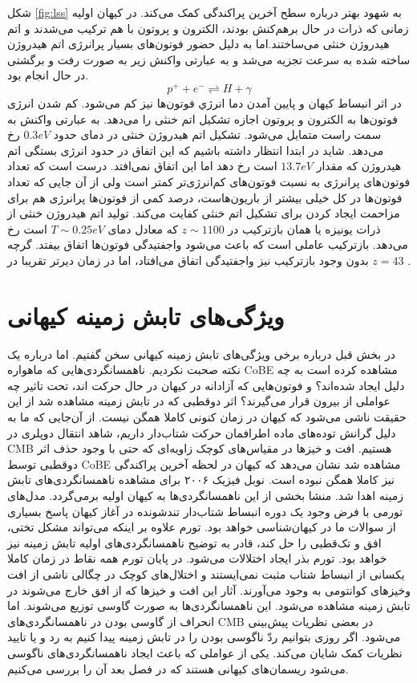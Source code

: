  شکل
\ref{fig:lss}
به شهود بهتر درباره سطح آخرین پراکندگی کمک می‌کند.   
 در کیهان اولیه زمانی که ذرات در حال برهم‌کنش بودند، الکترون و پروتون با هم ترکیب می‌شدند و اتم هیدروژن خنثی می‌ساختند.اما به دلیل حضور فوتون‌های بسیار پرانرژی اتم هیدروژن ساخته شده به سرعت تجزیه می‌شد و به عبارتی واکنش زیر به صورت رفت و برگشتی در حال انجام بود.
\begin{equation}
p^{+} + e^{-} \rightleftharpoons H + \gamma
\end{equation} 
در اثر انبساط کیهان و پایین آمدن دما انرژي فوتون‌ها نیز کم می‌شود. کم شدن انرژی فوتون‌ها به الکترون و پروتون اجازه تشکیل اتم خنثی را می‌دهد. به عبارتی واکنش به سمت راست متمایل می‌شود. تشکیل اتم هیدروژن خنثی در دمای حدود 
$0.3 eV$ 
رخ می‌دهد. شاید در ابتدا انتظار داشته باشیم که این اتفاق در حدود انرژی بستگی اتم هیدروژن که مقدار 
$13.7 eV$
است رخ دهد اما این اتفاق نمی‌افتد. درست است که تعداد فوتون‌های پرانرژی به نسبت فوتون‌های کم‌انرژی‌تر کمتر است ولی از آن جایی که تعداد فوتون‌ها در کل خیلی بیشتر از باریون‌هاست، درصد کمی از فوتون‌ها پرانرژی هم برای مزاحمت ایجاد کردن برای تشکیل اتم خنثی کفایت می‌کند. تولید اتم هیدروژن خنثی از ذرات یونیزه یا همان بازترکیب در 
$ z \sim 1100$ 
که معادل دمای 
$T \sim 0.25 eV$
است رخ می‌دهد.
\cite{dodelson2020modern} 
بازترکیب عاملی است که باعث می‌شود واجفتیدگی فوتون‌ها اتفاق بیفتد. گرچه بدون وجود بازترکیب نیز واجفتیدگی اتفاق می‌افتاد، اما در زمان دیرتر تقریبا در 
$z = 43 $
. 
\cite{dodelson2003modern} 

\section{ ویژگی‌های تابش زمینه کیهانی}
\label{sec:cmb_physics}
در بخش قبل درباره برخی ویژگی‌های تابش زمینه کیهانی سخن گفتیم. اما درباره یک نکته صحبت نکردیم. ناهمسانگردی‌هایی که ماهواره CoBE مشاهده کرده است به چه دلیل ایجاد شده‌اند؟ و فوتون‌هایی که آزادانه در کیهان در حال حرکت اند، تحت تاثیر چه عواملی از بیرون قرار می‌گیرند؟
اثر دوقطبی که در تابش زمینه مشاهده شد از این حقیقت ناشی می‌شود که کیهان در زمان کنونی کاملا همگن نیست. از آن‌جایی که ما به دلیل گرانش توده‌های ماده اطرافمان حرکت شتاب‌دار داریم، شاهد انتقال دوپلری در CMB هستیم. افت و خیزها در مقیاس‌های کوچک زاویه‌ای که حتی با وجود حذف اثر دوقطبی توسط CoBE مشاهده شد نشان می‌دهد که کیهان در لحظه آخرین پراکندگی نیز کاملا همگن نبوده است. نوبل فیزیک ۲۰۰۶ برای مشاهده ناهمسانگردی‌های تابش زمینه اهدا شد. منشا بخشی از این ناهمسانگردی‌ها به کیهان اولیه برمی‌گردد. مدل‌های تورمی با فرض وجود یک دوره انبساط شتاب‌دار تندشونده در آغاز کیهان پاسخ بسیاری از سوالات ما در کیهان‌شناسی خواهد بود. تورم علاوه بر اینکه می‌تواند مشکل تختی، افق و تک‌قطبی را حل کند، قادر به توضیح ناهمسانگردی‌های اولیه تابش زمینه نیز خواهد بود. تورم بذر ایجاد اختلالات می‌شود. در پایان تورم همه نقاط در زمان کاملا یکسانی از انبساط شتاب مثبت نمی‌ایستند و اختلال‌های کوچک در چگالی ناشی از افت وخیزهای کوانتومی به وجود می‌آورند. آثار این افت و خیزها که از افق خارج می‌شوند در تابش زمینه مشاهده می‌شود. این ناهمسانگردی‌ها به صورت گاوسی توزیع می‌شوند. اما انحراف از گاوسی بودن در ناهمسانگردی‌های CMB در بعضی نظریات پیش‌بینی می‌شود. اگر روزی بتوانیم ردّ ناگوسی بودن را در تابش زمینه پیدا کنیم به رد و یا تایید نظریات کمک شایان می‌کند. یکی از عواملی که باعث ایجاد ناهمسانگردی‌های ناگوسی می‌شود ریسمان‌های کیهانی هستند که در فصل بعد آن را بررسی می‌کنیم. 
